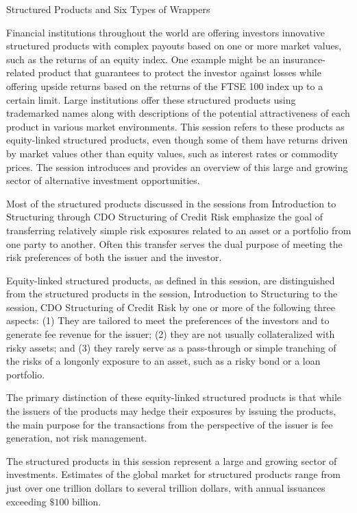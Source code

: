 \documentclass[11pt]{article}
\begin{document}
Structured Products and Six Types of Wrappers

Financial institutions throughout the world are offering investors innovative structured products with complex payouts based on one or more market values, such as the returns of an equity index. One example might be an insurance-related product that guarantees to protect the investor against losses while offering upside returns based on the returns of the FTSE 100 index up to a certain limit. Large institutions offer these structured products using trademarked names along with descriptions of the potential attractiveness of each product in various market environments. This session refers to these products as equity-linked structured products, even though some of them have returns driven by market values other than equity values, such as interest rates or commodity prices. The session introduces and provides an overview of this large and growing sector of alternative investment opportunities.

Most of the structured products discussed in the sessions from Introduction to Structuring through CDO Structuring of Credit Risk emphasize the goal of transferring relatively simple risk exposures related to an asset or a portfolio from one party to another. Often this transfer serves the dual purpose of meeting the risk preferences of both the issuer and the investor.

Equity-linked structured products, as defined in this session, are distinguished from the structured products in the session, Introduction to Structuring to the session, CDO Structuring of Credit Risk by one or more of the following three aspects: (1) They are tailored to meet the preferences of the investors and to generate fee revenue for the issuer; (2) they are not usually collateralized with risky assets; and (3) they rarely serve as a pass-through or simple tranching of the risks of a longonly exposure to an asset, such as a risky bond or a loan portfolio.

The primary distinction of these equity-linked structured products is that while the issuers of the products may hedge their exposures by issuing the products, the main purpose for the transactions from the perspective of the issuer is fee generation, not risk management.

The structured products in this session represent a large and growing sector of investments. Estimates of the global market for structured products range from just over one trillion dollars to several trillion dollars, with annual issuances exceeding $\$ 100$ billion.
\end{document}
